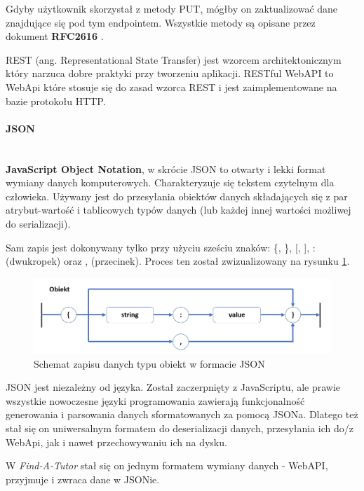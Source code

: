 \documentclass[12pt]{article}
\newcommand{\myparagraph}[1]{\paragraph{#1}\mbox{}\\}
\numberwithin{figure}{section}
\begin{document}
        Gdyby użytkownik skorzystał z metody PUT, mógłby on zaktualizować dane znajdujące się pod tym endpointem. Wszystkie metody są opisane przez dokument \textbf{RFC2616} \cite{http}.
        
        REST (ang. Representational State Transfer) jest wzorcem architektonicznym który narzuca dobre praktyki przy tworzeniu aplikacji.
        RESTful WebAPI to WebApi które stosuje się do zasad wzorca REST i jest zaimplementowane na bazie protokołu HTTP.
        
        \myparagraph{JSON}
        \indent
        \textbf{JavaScript Object Notation}, w skrócie JSON to otwarty i lekki format wymiany danych komputerowych. Charakteryzuje się tekstem czytelnym dla człowieka. Używany jest do przesyłania obiektów danych składających się z par atrybut-wartość i tablicowych typów danych (lub każdej innej wartości możliwej do serializacji).
        
        Sam zapis jest dokonywany tylko przy użyciu sześciu znaków: \{, \}, [, ], : (dwukropek) oraz , (przecinek). Proces ten został zwizualizowany na rysunku \ref{fig:json}.
        
        \begin{figure}[H] 
         	\centering
        	\includegraphics[width=1.0\textwidth]{images/chapter_3/json.png}
        	\caption{Schemat zapisu danych typu obiekt w formacie JSON}
        	\label{fig:json}
        \end{figure}
        
        JSON jest niezależny od języka. Został zaczerpnięty z JavaScriptu, ale prawie wszystkie nowoczesne języki programowania zawierają funkcjonalność generowania i parsowania danych sformatowanych za pomocą JSONa. Dlatego też stał się on uniwersalnym formatem do deserializacji danych, przesyłania ich do/z WebApi, jak i nawet przechowywaniu ich na dysku.
        
        W \textit{Find-A-Tutor} stał się on jednym formatem wymiany danych - WebAPI, przyjmuje i zwraca dane w JSONie. 
        
\end{document}
